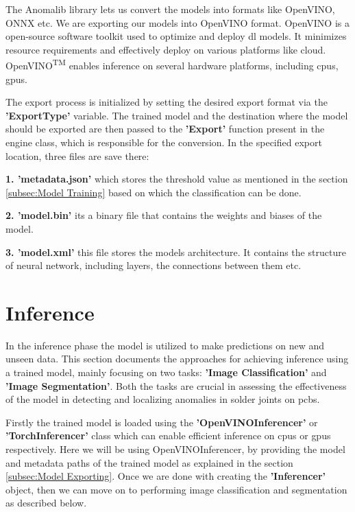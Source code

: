 The Anomalib library lets us convert the models into formats like OpenVINO, ONNX etc. We are exporting our models into OpenVINO format. OpenVINO is a open-source software toolkit used to optimize and deploy \gls{dl} models. It minimizes resource requirements and effectively deploy on various platforms like cloud. OpenVINO\textsuperscript{TM} enables inference on several hardware platforms, including \glspl{cpu}, \glspl{gpu}.\cite{openvino2024}

The export process is initialized by setting the desired export format via the \textbf{'ExportType'} variable. The trained model and the destination where the model should be exported are then passed to the \textbf{'Export'} function present in the engine class, which is responsible for the conversion. In the specified export location, three files are save there:

\textbf{1. 'metadata.json'} which stores the threshold value as mentioned in the section \ref{subsec:Model Training} based on which the classification can be done.

\textbf{2. 'model.bin'} its a binary file that contains the weights and biases of the model.

\textbf{3. 'model.xml'} this file stores the models architecture. It contains the structure of neural network, including layers, the connections between them etc.

\section{Inference}
\label{subsec:Inference}

In the inference phase the model is utilized to make predictions on new and unseen data. This section documents the approaches for achieving inference using a trained model, mainly focusing on two tasks: \textbf{'Image Classification'} and \textbf{'Image Segmentation'}. Both the tasks are crucial in assessing the effectiveness of the model in detecting and localizing anomalies in solder joints on \glspl{pcb}.

Firstly the trained model is loaded using the \textbf{'OpenVINOInferencer'} or \textbf{'TorchInferencer'} class which can enable efficient inference on \glspl{cpu} or \glspl{gpu} respectively. Here we will be using OpenVINOInferencer, by providing the model and metadata paths of the trained model as explained in the section \ref{subsec:Model Exporting}. Once we are done with creating the \textbf{'Inferencer'} object, then we can move on to performing image classification and segmentation as described below.

